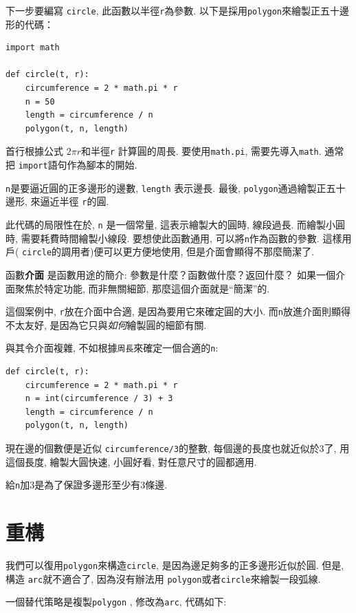 \documentclass[10pt]{book}
\begin{document}
下一步要編寫 {\tt circle}, 此函數以半徑{\tt r}為參數. 
以下是採用{\tt polygon}來繪製正五十邊形的代碼：

\begin{verbatim}
import math

def circle(t, r):
    circumference = 2 * math.pi * r
    n = 50
    length = circumference / n
    polygon(t, n, length)
\end{verbatim}
%
首行根據公式 $2 \pi r$和半徑{\tt r} 計算圓的周長. 
要使用{\tt math.pi},  需要先導入{\tt math}. 
通常把 {\tt import}語句作為腳本的開始. 

{\tt n}是要逼近圓的正多邊形的邊數, {\tt length} 表示邊長. 
最後,  {\tt polygon}通過繪製正五十邊形, 來逼近半徑 {\tt r}的圓. 

此代碼的局限性在於, {\tt n} 是一個常量, 這表示繪製大的圓時, 線段過長. 
而繪製小圓時, 需要耗費時間繪製小線段. 
要想使此函數通用, 可以將{\tt n}作為函數的參數. 
這樣用戶( {\tt circle}的調用者)便可以更方便地使用, 但是介面會顯得不那麼簡潔了. 

函數{\bf 介面} 是函數用途的簡介: 參數是什麼？函數做什麼？返回什麼？
如果一個介面聚焦於特定功能, 而非無關細節, 那麼這個介面就是``簡潔''的. 

這個案例中, {\tt r}放在介面中合適, 是因為要用它來確定圓的大小. 
而{\tt n}放進介面則顯得不太友好, 是因為它只與{\em 如何}繪製圓的細節有關. 

與其令介面複雜, 不如根據{\tt 周長}來確定一個合適的{\tt n}:

\begin{verbatim}
def circle(t, r):
    circumference = 2 * math.pi * r
    n = int(circumference / 3) + 3
    length = circumference / n
    polygon(t, n, length)
\end{verbatim}
%
現在邊的個數便是近似 {\tt circumference/3}的整數, 
每個邊的長度也就近似於3了, 用這個長度, 繪製大圓快速, 小圓好看, 
對任意尺寸的圓都適用. 

給{\tt n}加3是為了保證多邊形至少有3條邊. 

\section{重構}
\label{refactoring}

我們可以復用{\tt polygon}來構造{\tt circle}, 是因為邊足夠多的正多邊形近似於圓. 
但是, 構造 {\tt arc}就不適合了, 因為沒有辦法用 {\tt polygon}或者{\tt circle}來繪製一段弧線. 

一個替代策略是複製{\tt polygon} ,  修改為{\tt arc}, 代碼如下:
\end{document}
